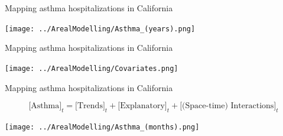 \documentclass[
10pt]{beamer}
\begin{document}
\begin{frame}{Mapping asthma hospitalizations in California}

\begin{center}
\texttt{[image: ../ArealModelling/Asthma\_(years).png]}
\end{center}

\end{frame}


\begin{frame}{Mapping asthma hospitalizations in California}

\begin{center}
\texttt{[image: ../ArealModelling/Covariates.png]}
\end{center}

\end{frame}

\begin{frame}{Mapping asthma hospitalizations in California}

{\small
\[
 \mbox{[Asthma]}_t = \mbox{[Trends]}_t + \mbox{[Explanatory]}_t + \mbox{[(Space-time) Interactions]}_t
\]
}
\vspace{-0.25cm}
\begin{center}
\texttt{[image: ../ArealModelling/Asthma\_(months).png]}
\end{center}

\end{frame}
\end{document}
